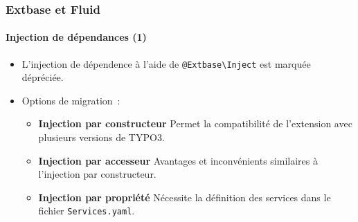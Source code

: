 %

\begin{frame}[fragile]
	\frametitle{Extbase et Fluid}
	\framesubtitle{Injection de dépendances (1)}


	\begin{itemize}
		\item L'injection de dépendence à l'aide de
			\small\texttt{@Extbase\textbackslash Inject}\normalsize\newline
			est marquée dépréciée.

		\item Options de migration~:

			\begin{itemize}\small
				\item \textbf{Injection par constructeur}\newline
				 	Permet la compatibilité de l'extension avec plusieurs versions de TYPO3.
				\item \textbf{Injection par accesseur}\newline
					Avantages et inconvénients similaires à l'injection par constructeur.
				\item \textbf{Injection par propriété}\newline
					Nécessite la définition des services dans le fichier \texttt{Services.yaml}.
			\end{itemize}\normalsize

	\end{itemize}

\end{frame}

